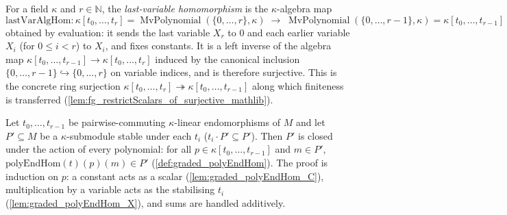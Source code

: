 \begin{definition}\leanok
  \label{lem:graded_lastVarAlgHom}
  For a field \(\kappa\) and \(r \in \mathbb{N}\), the \emph{last-variable
  homomorphism} is the \(\kappa\)-algebra map
  \[
    \mathrm{lastVarAlgHom} : \kappa[t_0, \dots, t_r]
      = \operatorname{MvPolynomial}(\{0,\dots,r\}, \kappa)
      \;\longrightarrow\;
      \operatorname{MvPolynomial}(\{0,\dots,r-1\}, \kappa) = \kappa[t_0, \dots, t_{r-1}]
  \]
  obtained by evaluation: it sends the last variable \(X_r\) to \(0\) and each
  earlier variable \(X_i\) (for \(0 \le i < r\)) to \(X_i\), and fixes constants.
  It is a left inverse of the algebra map
  \(\kappa[t_0, \dots, t_{r-1}] \to \kappa[t_0, \dots, t_r]\)
  induced by the canonical inclusion \(\{0, \dots, r-1\} \hookrightarrow \{0, \dots, r\}\)
  on variable indices, and is therefore surjective. This is the concrete
  ring surjection \(\kappa[t_0, \dots, t_r] \twoheadrightarrow
  \kappa[t_0, \dots, t_{r-1}]\) along which finiteness is transferred
  (\cref{lem:fg_restrictScalars_of_surjective_mathlib}).
\end{definition}

\begin{lemma}\leanok
  \label{lem:graded_polyEndHom_mem_of_stable}
  Let \(t_0, \dots, t_{r-1}\) be pairwise-commuting \(\kappa\)-linear endomorphisms
  of \(M\) and let \(P' \subseteq M\) be a \(\kappa\)-submodule stable under each
  \(t_i\) (\(t_i \cdot P' \subseteq P'\)). Then \(P'\) is closed under the action of
  every polynomial: for all \(p \in \kappa[t_0, \dots, t_{r-1}]\) and \(m \in P'\),
  \(\mathrm{polyEndHom}(t)(p)(m) \in P'\) (\cref{def:graded_polyEndHom}). The proof
  is induction on \(p\): a constant acts as a scalar (\cref{lem:graded_polyEndHom_C}),
  multiplication by a variable acts as the stabilising \(t_i\)
  (\cref{lem:graded_polyEndHom_X}), and sums are handled additively.
\end{lemma}

